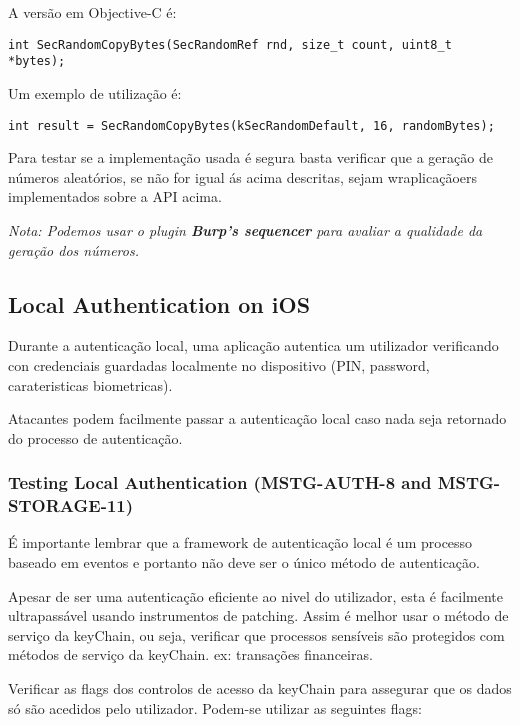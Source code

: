  
A versão em Objective-C é:
\begin{lstlisting}[basicstyle=\small,]
 int SecRandomCopyBytes(SecRandomRef rnd, size_t count, uint8_t *bytes);
\end{lstlisting}
Um exemplo de utilização é:
\begin{lstlisting}[basicstyle=\small,]
  int result = SecRandomCopyBytes(kSecRandomDefault, 16, randomBytes);
\end{lstlisting}

Para testar se a implementação usada é segura basta verificar que a geração de números aleatórios, se não for igual ás acima descritas, sejam wraplicaçãoers implementados sobre a API acima. 

\textit{Nota: Podemos usar o plugin \textbf{Burp's sequencer} para avaliar a qualidade da geração dos números.}


\subsection{Local Authentication on iOS}
\hfill\par
Durante a autenticação local, uma aplicação autentica um utilizador verificando con credenciais guardadas localmente no dispositivo (PIN, password, carateristicas biometricas).

Atacantes podem facilmente passar a autenticação local caso nada seja retornado do processo de autenticação.


\subsubsection{Testing Local Authentication (MSTG-AUTH-8 and MSTG-STORAGE-11)}
\hfill\par
\hfill\par
É importante lembrar que a framework de autenticação local é um processo baseado em eventos e portanto não deve ser o único método de autenticação.\par
\hfill\par


Apesar de ser uma autenticação eficiente ao nivel do utilizador, esta é facilmente ultrapassável usando instrumentos de patching. Assim é melhor usar o método de serviço da keyChain, ou seja, verificar que processos sensíveis são protegidos com métodos de serviço da keyChain. ex: transações financeiras.\par

Verificar as flags dos controlos de acesso da keyChain para assegurar que os dados só são acedidos pelo utilizador. Podem-se utilizar as seguintes flags: 

